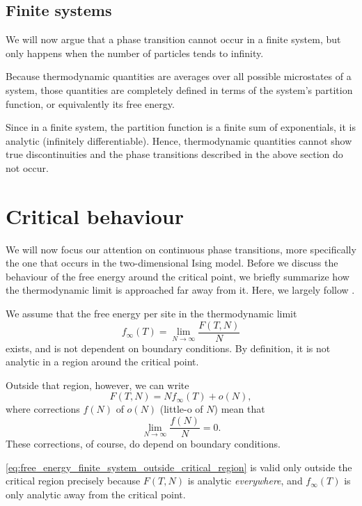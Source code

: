 \subsection{Finite systems}

We will now argue that a phase transition cannot occur in a finite system,
but only happens when the number of particles tends to infinity.

Because thermodynamic quantities are averages over all possible
microstates of a system, those quantities are completely defined in terms
of the system's partition function, or equivalently its free energy.

Since in a finite system, the partition function is a finite sum of
exponentials, it is analytic (infinitely differentiable). Hence, thermodynamic
quantities cannot show true discontinuities and the phase transitions
described in the above section do not occur.


\section{Critical behaviour}
We will now focus our attention on continuous phase transitions, more specifically the one that occurs in the
two-dimensional Ising model.
Before we discuss the behaviour of the free energy around the critical point,
we briefly summarize how the thermodynamic limit is approached far away from it.
Here, we largely follow \cite{barber1983finite}.

We assume that the free energy per site in the thermodynamic limit
\begin{equation}
  f_{\infty}(T) = \lim_{N \to \infty} \frac{F(T, N)}{N}
\end{equation}
exists, and is not dependent on boundary conditions.
By definition, it is not analytic in a region around the critical point.

Outside that region, however, we can write
\begin{equation}\label{eq:free_energy_finite_system_outside_critical_region}
  F(T, N) = N f_{\infty}(T) + o(N),
\end{equation}
where corrections $f(N)$ of $o(N)$ (little-o of $N$) mean that
\begin{equation}
  \lim_{N \to \infty} \frac{f(N)}{N} = 0.
\end{equation}
These corrections, of course, do depend on boundary conditions.

\autoref{eq:free_energy_finite_system_outside_critical_region} is valid only outside the critical region precisely
because $F(T, N)$ is analytic \emph{everywhere}, and $f_{\infty}(T)$ is only analytic away from the critical point.

